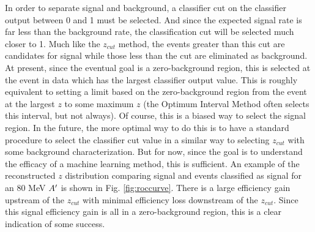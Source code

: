 In order to separate signal and background, a classifier cut on the classifier output between 0 and 1 must be selected. And since the expected signal rate is far less than the background rate, the classification cut will be selected much closer to 1. Much like the $z_{cut}$ method, the events greater than this cut are candidates for signal while those less than the cut are eliminated as background. At present, since the eventual goal is a zero-background region, this is selected at the event in data which has the largest classifier output value. This is roughly equivalent to setting a limit based on the zero-background region from the event at the largest $z$ to some maximum $z$ (the Optimum Interval Method often selects this interval, but not always). Of course, this is a biased way to select the signal region. In the future, the more optimal way to do this is to have a standard procedure to select the classifier cut value in a similar way to selecting $z_{cut}$ with some background characterization. But for now, since the goal is to understand the efficacy of a machine learning method, this is sufficient. An example of the reconstructed $z$ distribution comparing signal and events classified as signal for an 80 MeV $A^\prime$ is shown in Fig. \ref{fig:roccurve}. There is a large efficiency gain upstream of the $z_{cut}$ with minimal efficiency loss downstream of the $z_{cut}$. Since this signal efficiency gain is all in a zero-background region, this is a clear indication of some success.


